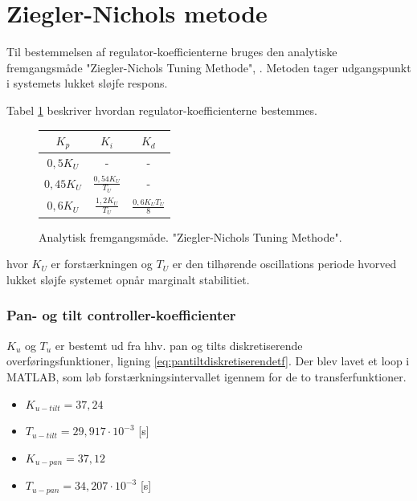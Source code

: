 \section{Ziegler-Nichols metode}
Til bestemmelsen af regulator-koefficienterne bruges den analytiske fremgangsmåde "Ziegler-Nichols Tuning Methode", \citep[Kap. 7.6]{reg_modern_control_systems}. 
Metoden tager udgangspunkt i systemets lukket sløjfe respons. 

Tabel \ref{tb:ZieglerNichols} beskriver hvordan regulator-koefficienterne bestemmes.

\begin{figure}[th!]
\centering
\begin{tabular}{c|c|c}
\(K_p\) & \(K_i\) & \(K_d\)\\\hline
\(0,5  { K }_{ U }\) &-&-\\
\(0,45  { K }_{ U }\) & \( \frac { 0,54  { K }_{ U } }{ { T }_{ U } }  \) &-\\
\(0,6  { K }_{ U } \) &  \( \frac { 1,2  { K }_{ U } }{ { T }_{ U } }  \) & \(\frac { 0,6  { K }_{ U }  { T }_{ U } }{ 8 }  \)
\end{tabular}
\captionsetup{type=table}
\caption[Ziegler-Nichols Tuning Methode]{Analytisk fremgangsmåde. "Ziegler-Nichols Tuning Methode".}
\label{tb:ZieglerNichols}
\end{figure}

hvor \(K_U\) er forstærkningen og \(T_U\) er den tilhørende oscillations periode hvorved lukket sløjfe systemet opnår marginalt stabilitiet.

\subsubsection{Pan- og tilt controller-koefficienter}
\(K_u\) og \(T_u\) er bestemt ud fra hhv. pan og tilts diskretiserende overføringsfunktioner, ligning \ref{eq:pantiltdiskretiserendetf}. 
Der blev lavet et loop i MATLAB, som løb forstærkningsintervallet igennem for de to transferfunktioner.
\begin{itemize}
\itemsep1pt
\item \(K_{u-tilt} = 37,24\)
\item \(T_{u-tilt} = 29,917 \cdot 10^{-3}\) [s] 
\item \(K_{u-pan} = 37,12\)
\item \(T_{u-pan} = 34,207\cdot 10^{-3}\) [s] 
\end{itemize}

